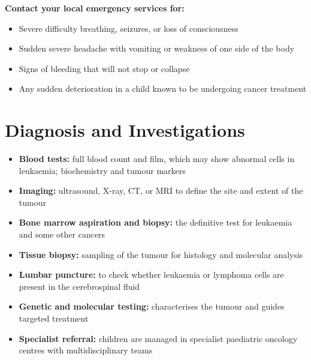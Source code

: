 \textbf{Contact your local emergency services for:}
\begin{itemize}
    \item Severe difficulty breathing, seizures, or loss of consciousness
    \item Sudden severe headache with vomiting or weakness of one side of the body
    \item Signs of bleeding that will not stop or collapse
    \item Any sudden deterioration in a child known to be undergoing cancer treatment
\end{itemize}

\section*{Diagnosis and Investigations}
\begin{itemize}
    \item \textbf{Blood tests:} full blood count and film, which may show abnormal cells in leukaemia; biochemistry and tumour markers
    \item \textbf{Imaging:} ultrasound, X-ray, CT, or MRI to define the site and extent of the tumour
    \item \textbf{Bone marrow aspiration and biopsy:} the definitive test for leukaemia and some other cancers
    \item \textbf{Tissue biopsy:} sampling of the tumour for histology and molecular analysis
    \item \textbf{Lumbar puncture:} to check whether leukaemia or lymphoma cells are present in the cerebrospinal fluid
    \item \textbf{Genetic and molecular testing:} characterises the tumour and guides targeted treatment
    \item \textbf{Specialist referral:} children are managed in specialist paediatric oncology centres with multidisciplinary teams
\end{itemize}

